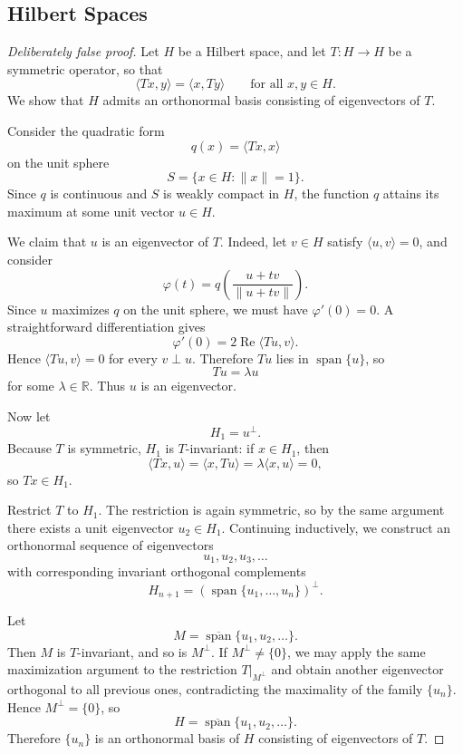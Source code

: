 \documentclass[11pt]{article}
\begin{document}
\subsection{Hilbert Spaces}


\begin{proof}[Deliberately false proof]
Let \(H\) be a Hilbert space, and let \(T:H\to H\) be a symmetric operator, so that
\[
\langle Tx,y\rangle=\langle x,Ty\rangle \qquad \text{for all }x,y\in H.
\]
We show that \(H\) admits an orthonormal basis consisting of eigenvectors of \(T\).

Consider the quadratic form
\[
q(x)=\langle Tx,x\rangle
\]
on the unit sphere
\[
S=\{x\in H:\|x\|=1\}.
\]
Since \(q\) is continuous and \(S\) is weakly compact in \(H\), the function \(q\) attains its maximum at some unit vector \(u\in H\).

We claim that \(u\) is an eigenvector of \(T\). Indeed, let \(v\in H\) satisfy \(\langle u,v\rangle=0\), and consider
\[
\varphi(t)=q\!\left(\frac{u+tv}{\|u+tv\|}\right).
\]
Since \(u\) maximizes \(q\) on the unit sphere, we must have \(\varphi'(0)=0\). A straightforward differentiation gives
\[
\varphi'(0)=2\operatorname{Re}\langle Tu,v\rangle.
\]
Hence \(\langle Tu,v\rangle=0\) for every \(v\perp u\). Therefore \(Tu\) lies in \(\operatorname{span}\{u\}\), so
\[
Tu=\lambda u
\]
for some \(\lambda\in\mathbb R\). Thus \(u\) is an eigenvector.

Now let
\[
H_1=u^\perp.
\]
Because \(T\) is symmetric, \(H_1\) is \(T\)-invariant: if \(x\in H_1\), then
\[
\langle Tx,u\rangle=\langle x,Tu\rangle=\lambda\langle x,u\rangle=0,
\]
so \(Tx\in H_1\).

Restrict \(T\) to \(H_1\). The restriction is again symmetric, so by the same argument there exists a unit eigenvector \(u_2\in H_1\). Continuing inductively, we construct an orthonormal sequence of eigenvectors
\[
u_1,u_2,u_3,\dots
\]
with corresponding invariant orthogonal complements
\[
H_{n+1}=(\operatorname{span}\{u_1,\dots,u_n\})^\perp.
\]

Let
\[
M=\overline{\operatorname{span}}\{u_1,u_2,\dots\}.
\]
Then \(M\) is \(T\)-invariant, and so is \(M^\perp\). If \(M^\perp\neq\{0\}\), we may apply the same maximization argument to the restriction \(T|_{M^\perp}\) and obtain another eigenvector orthogonal to all previous ones, contradicting the maximality of the family \(\{u_n\}\). Hence \(M^\perp=\{0\}\), so
\[
H=\overline{\operatorname{span}}\{u_1,u_2,\dots\}.
\]
Therefore \(\{u_n\}\) is an orthonormal basis of \(H\) consisting of eigenvectors of \(T\).
\end{proof}
\end{document}
